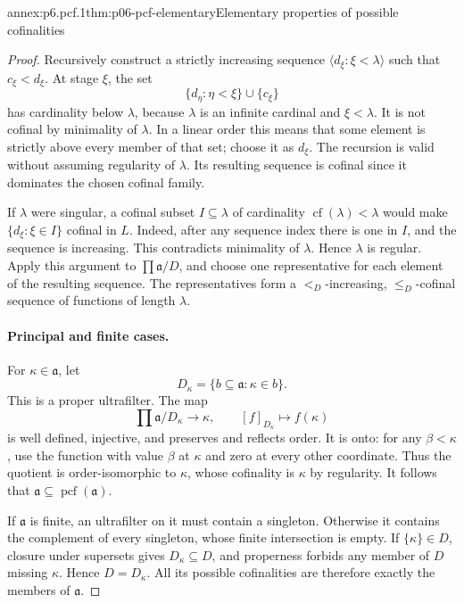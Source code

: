 \begin{annexitem}{annex:p6.pcf.1}{thm:p06-pcf-elementary}{Elementary properties of possible cofinalities}
\begin{proof}
Recursively construct a strictly increasing sequence
\(\langle d_\xi:\xi<\lambda\rangle\) such that \(c_\xi<d_\xi\).
At stage \(\xi\), the set
\[
 \{d_\eta:\eta<\xi\}\cup\{c_\xi\}
\]
has cardinality below \(\lambda\), because \(\lambda\) is an infinite
cardinal and \(\xi<\lambda\).
It is not cofinal by minimality of \(\lambda\).
In a linear order this means that some element is strictly above
every member of that set; choose it as \(d_\xi\).
The recursion is valid without assuming regularity of \(\lambda\).
Its resulting sequence is cofinal since it dominates the chosen
cofinal family.

If \(\lambda\) were singular, a cofinal subset \(I\subseteq\lambda\)
of cardinality \(\operatorname{cf}(\lambda)<\lambda\) would make
\(\{d_\xi:\xi\in I\}\) cofinal in \(L\).
Indeed, after any sequence index there is one in \(I\), and the
sequence is increasing.  This contradicts minimality of \(\lambda\).
Hence \(\lambda\) is regular.
Apply this argument to \(\prod\mathfrak a/D\), and choose one
representative for each element of the resulting sequence.
The representatives form a \(<_D\)-increasing, \(\leq_D\)-cofinal
sequence of functions of length \(\lambda\).

\paragraph{Principal and finite cases.}
For \(\kappa\in\mathfrak a\), let
\[
 D_\kappa=\{b\subseteq\mathfrak a:\kappa\in b\}.
\]
This is a proper ultrafilter.
The map
\[
 \prod\mathfrak a/D_\kappa\longrightarrow\kappa,
 \qquad [f]_{D_\kappa}\longmapsto f(\kappa)
\]
is well defined, injective, and preserves and reflects order.
It is onto: for any \(\beta<\kappa\), use the function with value
\(\beta\) at \(\kappa\) and zero at every other coordinate.
Thus the quotient is order-isomorphic to \(\kappa\), whose
cofinality is \(\kappa\) by regularity.
It follows that \(\mathfrak a\subseteq\operatorname{pcf}(\mathfrak a)\).

If \(\mathfrak a\) is finite, an ultrafilter on it must contain a
singleton.  Otherwise it contains the complement of every singleton,
whose finite intersection is empty.
If \(\{\kappa\}\in D\), closure under supersets gives
\(D_\kappa\subseteq D\), and properness forbids any member of \(D\)
missing \(\kappa\).  Hence \(D=D_\kappa\).
All its possible cofinalities are therefore exactly the members of
\(\mathfrak a\).
\end{proof}
\end{annexitem}

